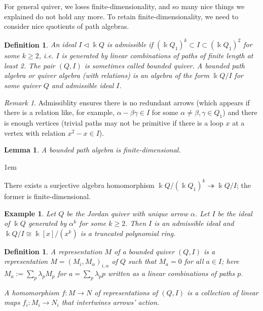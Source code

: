 \documentclass[11pt,a4paper]{article}
\makeatletter
\numberwithin{equation}{section}
\renewenvironment{proof}[1][\proofname]{\par
    \pushQED{\qed}%
    \normalfont \topsep0\p@\@plus6\p@ \labelsep1em\relax
    \trivlist
    \item[\hskip\labelsep\indent
        \bfseries #1]\ignorespaces
    \mbox{}
}{
    \popQED\endtrivlist\@endpefalse
}
\theoremstyle{all}
\newtheorem{lemma}[theorem]{Lemma}
\newtheorem{example}[theorem]{Example}
\newtheorem{definition}[theorem]{Definition}
\theoremstyle{remark}
\newtheorem{remark}[theorem]{Remark}
\newcommand{\defn}[1]{\textsl{\color{darkblue} #1}}
\makeatother
\begin{document}
For general quiver, we loses finite-dimensionality, and so many nice things we explained do not hold any more.  To retain finite-dimensionality, we need to consider nice quotients of path algebras.


\begin{definition}
An ideal $I\lhd \Bbbk Q$ is \defn{admissible} if $(\Bbbk Q_1)^k \subset I\subset (\Bbbk Q_1)^2$ for some $k\geq 2$, i.e. $I$ is generated by linear combinations of paths of finite length at least 2.
The pair $(Q,I)$ is sometimes called \defn{bounded quiver}.
A \defn{bounded path algebra} or \defn{quiver algebra} (with relations) is an algebra of the form $\Bbbk Q/I$ for some quiver $Q$ and admissible ideal $I$.
\end{definition}
\begin{remark}
Admissiblity ensures there is no redundant arrows (which appears if there is a relation like, for example, $\alpha-\beta\gamma\in I$ for some $\alpha\neq \beta,\gamma\in Q_1$) and there is enough vertices (trivial paths may not be primitive if there is a loop $x$ at a vertex with relation $x^2-x\in I$).
\end{remark}

\begin{lemma}
A bounded path algebra is finite-dimensional.
\end{lemma}
\begin{proof}
There exists a surjective algebra homomorphism $\Bbbk Q/(\Bbbk Q_1)^k \twoheadrightarrow \Bbbk Q/I$; the former is finite-dimensional.
\end{proof}

\begin{example}
Let $Q$ be the Jordan quiver with unique arrow $\alpha$.
Let $I$ be the ideal of $\Bbbk Q$ generated by $\alpha^k$ for some $k\geq 2$.
Then $I$ is an admissible ideal and $\Bbbk Q/I \cong \Bbbk [x]/(x^k)$ is a \defn{truncated polynomial ring}.
\end{example}

\begin{definition}
A \defn{representation} $M$ of a bounded quiver $(Q,I)$ is a representation $M=(M_i,M_\alpha)_{i,\alpha}$ of $Q$ such that $M_a=0$ for all $a\in I$; here $M_a:=\sum_{p}\lambda_pM_{p}$ for $a=\sum_p \lambda_p p$ written as a linear combinations of paths $p$.

A \defn{homomorphism} $f:M\to N$ of representations of $(Q,I)$ is a collection of linear maps $f_i:M_i\to N_i$ that intertwines arrows' action.
\end{definition}
\end{document}
